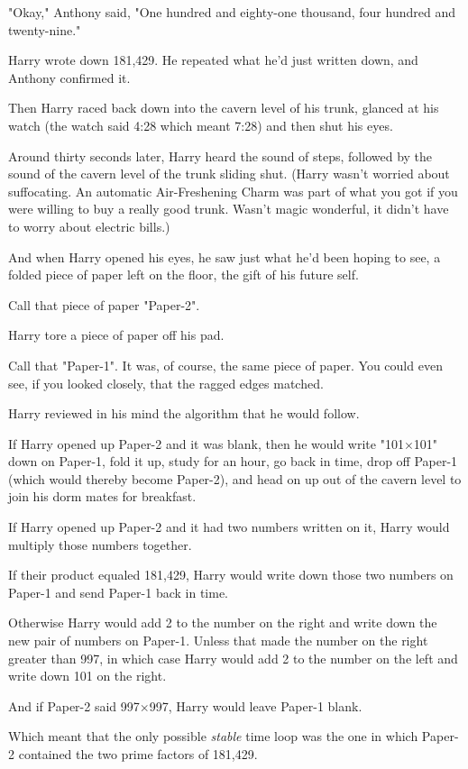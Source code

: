 "Okay," Anthony said, "One hundred and eighty-one thousand, four hundred and
twenty-nine."

Harry wrote down 181,429. He repeated what he'd just written down, and Anthony
confirmed it.

Then Harry raced back down into the cavern level of his trunk, glanced at his
watch (the watch said 4:28 which meant 7:28) and then shut his eyes.

Around thirty seconds later, Harry heard the sound of steps, followed by the
sound of the cavern level of the trunk sliding shut. (Harry wasn't worried
about suffocating. An automatic Air-Freshening Charm was part of what you got
if you were willing to buy a really good trunk. Wasn't magic wonderful, it
didn't have to worry about electric bills.)

And when Harry opened his eyes, he saw just what he'd been hoping to see, a
folded piece of paper left on the floor, the gift of his future self.

Call that piece of paper "Paper-2".

Harry tore a piece of paper off his pad.

Call that "Paper-1". It was, of course, the same piece of paper. You could even
see, if you looked closely, that the ragged edges matched.

Harry reviewed in his mind the algorithm that he would follow.

If Harry opened up Paper-2 and it was blank, then he would write "101$\times$101"
down on Paper-1, fold it up, study for an hour, go back in time, drop off
Paper-1 (which would thereby become Paper-2), and head on up out of the cavern
level to join his dorm mates for breakfast.

If Harry opened up Paper-2 and it had two numbers written on it, Harry would
multiply those numbers together.

If their product equaled 181,429, Harry would write down those two numbers on
Paper-1 and send Paper-1 back in time.

Otherwise Harry would add 2 to the number on the right and write down the new
pair of numbers on Paper-1. Unless that made the number on the right greater
than 997, in which case Harry would add 2 to the number on the left and write
down 101 on the right.

And if Paper-2 said 997$\times$997, Harry would leave Paper-1 blank.

Which meant that the only possible \emph{stable} time loop was the one in which
Paper-2 contained the two prime factors of 181,429.

